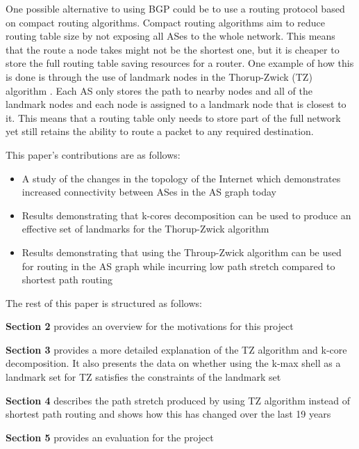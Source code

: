 \documentclass{dissertation/mpaper}
\begin{document}
One possible alternative to using BGP could be to use a routing protocol based on compact routing algorithms. Compact routing algorithms aim to reduce routing table size by not exposing all ASes to the whole network. This means that the route a node takes might not be the shortest one, but it is cheaper to store the full routing table saving resources for a router. One example of how this is done is through the use of landmark nodes in the Thorup-Zwick (TZ) algorithm \cite{thorup}. Each AS only stores the path to nearby nodes and all of the landmark nodes and each node is assigned to a landmark node that is closest to it. This means that a routing table only needs to store part of the full network yet still retains the ability to route a packet to any required destination. 

This paper's contributions are as follows:
\begin{itemize}
    \item A study of the changes in the topology of the Internet which demonstrates increased connectivity between ASes in the AS graph today
    \item Results demonstrating that k-cores decomposition can be used to produce an effective set of landmarks for the Thorup-Zwick algorithm
    \item Results demonstrating that using the Throup-Zwick algorithm can be used for routing in the AS graph while incurring low path stretch compared to shortest path routing 
\end{itemize}

The rest of this paper is structured as follows:\newline

\textbf{Section 2} provides an overview for the motivations for this project\newline

\textbf{Section 3} provides a more detailed explanation of the TZ algorithm and k-core decomposition. It also presents the data on whether using the k-max shell as a landmark set for TZ satisfies the constraints of the landmark set\newline

\textbf{Section 4 } describes the path stretch produced by using TZ algorithm instead of shortest path routing and shows how this has changed over the last 19 years\newline

\textbf{Section 5} provides an evaluation for the project\newline
\end{document}
